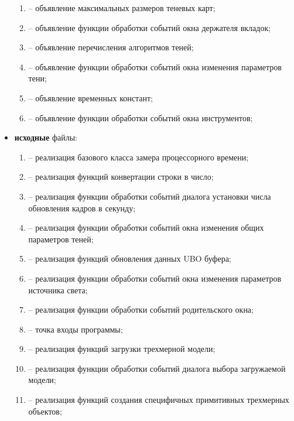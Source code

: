\begin{itemize}[label=---]
\begin{enumerate}[label=\arabic*), labelsep=0.5em]
        \item {} -- объявление максимальных размеров теневых карт;
        \item {} -- объявление функции обработки событий окна держателя вкладок;
        \item {} -- объявление перечисления алгоритмов теней;
        \item {} -- объявление функции обработки событий окна изменения параметров тени;
        \item {} -- объявление временных констант;
        \item {} -- объявление функции обработки событий окна инструментов;
    \end{enumerate}
    \item \textbf{исходные} файлы:
    \begin{enumerate}[label=\arabic*), labelsep=0.5em]
        \item {} -- реализация базового класса замера процессорного времени;
        \item {} -- реализация функций конвертации строки в число;
        \item {} -- реализация функции обработки событий диалога установки числа обновления кадров в секунду;
        \item {} -- реализация функции обработки событий окна изменения общих параметров теней;
        \item {} -- реализация функций обновления данных UBO буфера;
        \item {} -- реализация функции обработки событий окна изменения параметров источника света;
        \item {} -- реализация функции обработки событий родительского окна;
        \item {} -- точка входы программы;
        \item {} -- реализация функций загрузки трехмерной модели;
        \item {} -- реализация функции обработки событий диалога выбора загружаемой модели;
        \item {} -- реализация функций создания специфичных примитивных трехмерных объектов;

\end{enumerate}
\end{itemize}
